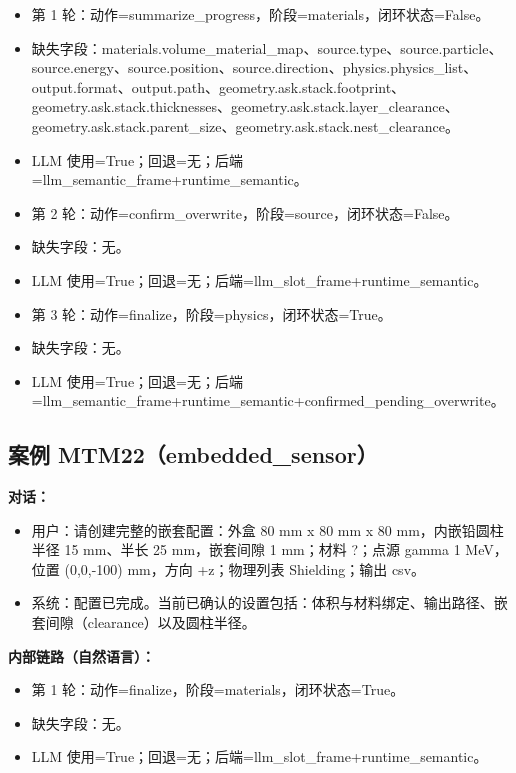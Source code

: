 \documentclass[11pt]{ctexart}
\begin{document}
\begin{itemize}
\item 第 1 轮：动作=summarize\_progress，阶段=materials，闭环状态=False。
\item 缺失字段：materials.volume\_material\_map、source.type、source.particle、source.energy、source.position、source.direction、physics.physics\_list、output.format、output.path、geometry.ask.stack.footprint、geometry.ask.stack.thicknesses、geometry.ask.stack.layer\_clearance、geometry.ask.stack.parent\_size、geometry.ask.stack.nest\_clearance。
\item LLM 使用=True；回退=无；后端=llm\_semantic\_frame+runtime\_semantic。
\item 第 2 轮：动作=confirm\_overwrite，阶段=source，闭环状态=False。
\item 缺失字段：无。
\item LLM 使用=True；回退=无；后端=llm\_slot\_frame+runtime\_semantic。
\item 第 3 轮：动作=finalize，阶段=physics，闭环状态=True。
\item 缺失字段：无。
\item LLM 使用=True；回退=无；后端=llm\_semantic\_frame+runtime\_semantic+confirmed\_pending\_overwrite。
\end{itemize}
\subsection{案例 MTM22（embedded\_sensor）}
\textbf{对话：}
\begin{itemize}
\item 用户：请创建完整的嵌套配置：外盒 80 mm x 80 mm x 80 mm，内嵌铅圆柱半径 15 mm、半长 25 mm，嵌套间隙 1 mm；材料 ?；点源 gamma 1 MeV，位置 (0,0,-100) mm，方向 +z；物理列表 Shielding；输出 csv。
\item 系统：配置已完成。当前已确认的设置包括：体积与材料绑定、输出路径、嵌套间隙（clearance）以及圆柱半径。
\end{itemize}
\textbf{内部链路（自然语言）：}
\begin{itemize}
\item 第 1 轮：动作=finalize，阶段=materials，闭环状态=True。
\item 缺失字段：无。
\item LLM 使用=True；回退=无；后端=llm\_slot\_frame+runtime\_semantic。
\end{itemize}
\end{document}
